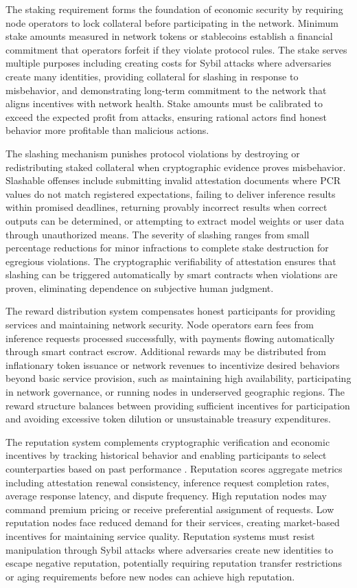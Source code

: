 The staking requirement forms the foundation of economic security by requiring node operators to lock collateral before participating in the network. Minimum stake amounts measured in network tokens or stablecoins establish a financial commitment that operators forfeit if they violate protocol rules. The stake serves multiple purposes including creating costs for Sybil attacks where adversaries create many identities, providing collateral for slashing in response to misbehavior, and demonstrating long-term commitment to the network that aligns incentives with network health. Stake amounts must be calibrated to exceed the expected profit from attacks, ensuring rational actors find honest behavior more profitable than malicious actions.

The slashing mechanism punishes protocol violations by destroying or redistributing staked collateral when cryptographic evidence proves misbehavior. Slashable offenses include submitting invalid attestation documents where PCR values do not match registered expectations, failing to deliver inference results within promised deadlines, returning provably incorrect results when correct outputs can be determined, or attempting to extract model weights or user data through unauthorized means. The severity of slashing ranges from small percentage reductions for minor infractions to complete stake destruction for egregious violations. The cryptographic verifiability of attestation ensures that slashing can be triggered automatically by smart contracts when violations are proven, eliminating dependence on subjective human judgment.

The reward distribution system compensates honest participants for providing services and maintaining network security. Node operators earn fees from inference requests processed successfully, with payments flowing automatically through smart contract escrow. Additional rewards may be distributed from inflationary token issuance or network revenues to incentivize desired behaviors beyond basic service provision, such as maintaining high availability, participating in network governance, or running nodes in underserved geographic regions. The reward structure balances between providing sufficient incentives for participation and avoiding excessive token dilution or unsustainable treasury expenditures.

The reputation system complements cryptographic verification and economic incentives by tracking historical behavior and enabling participants to select counterparties based on past performance \cite{reputation_systems}. Reputation scores aggregate metrics including attestation renewal consistency, inference request completion rates, average response latency, and dispute frequency. High reputation nodes may command premium pricing or receive preferential assignment of requests. Low reputation nodes face reduced demand for their services, creating market-based incentives for maintaining service quality. Reputation systems must resist manipulation through Sybil attacks where adversaries create new identities to escape negative reputation, potentially requiring reputation transfer restrictions or aging requirements before new nodes can achieve high reputation.

